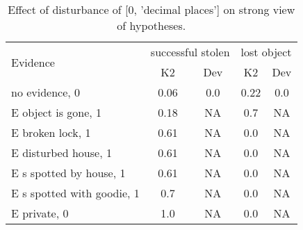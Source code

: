 \begin{table}\begin{tabular}{l|cc|cc}\toprule\multirow{2}{*}{Evidence} & \multicolumn{2}{c}{successful stolen}& \multicolumn{2}{c}{lost object}\\& {K2} & {Dev}& {K2} & {Dev}\\\midrule
no evidence, 0 & \cellcolor{Bittersweet}0.06&\cellcolor{Bittersweet}0.0&\cellcolor{Bittersweet}0.22&\cellcolor{Bittersweet}0.0\\E object is gone, 1 & \cellcolor{Bittersweet}0.18&\cellcolor{Bittersweet}NA&\cellcolor{Bittersweet}0.7&\cellcolor{Bittersweet}NA\\E broken lock, 1 & \cellcolor{Bittersweet}0.61&\cellcolor{Bittersweet}NA&\cellcolor{Bittersweet}0.0&\cellcolor{Bittersweet}NA\\E disturbed house, 1 & \cellcolor{Bittersweet}0.61&\cellcolor{Bittersweet}NA&\cellcolor{Bittersweet}0.0&\cellcolor{Bittersweet}NA\\E s spotted by house, 1 & \cellcolor{Bittersweet}0.61&\cellcolor{Bittersweet}NA&\cellcolor{Bittersweet}0.0&\cellcolor{Bittersweet}NA\\E s spotted with goodie, 1 & \cellcolor{Bittersweet}0.7&\cellcolor{Bittersweet}NA&\cellcolor{Bittersweet}0.0&\cellcolor{Bittersweet}NA\\E private, 0 & \cellcolor{Bittersweet}1.0&\cellcolor{Bittersweet}NA&\cellcolor{Bittersweet}0.0&\cellcolor{Bittersweet}NA\\\bottomrule\end{tabular}\caption{Effect of disturbance of [0, 'decimal places'] on strong view of hypotheses.}\end{table}